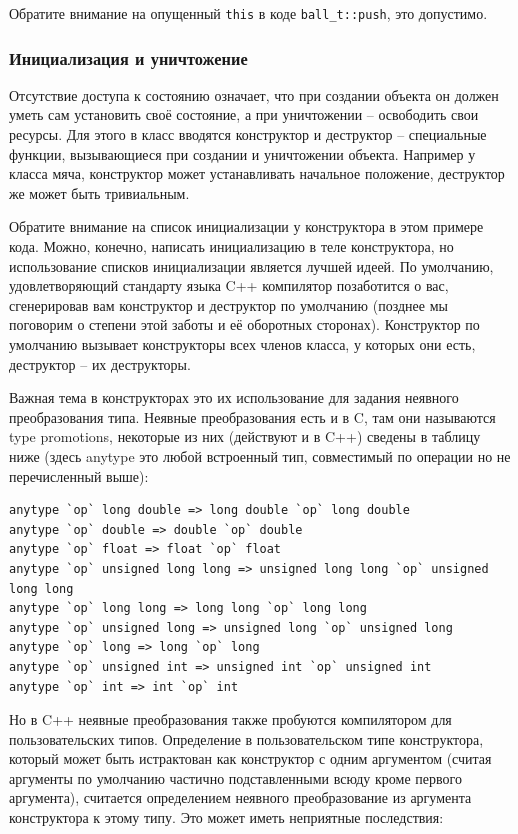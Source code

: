 \documentclass[a4paper,12pt,oneside]{article}
\begin{document}
Обратите внимание на опущенный \lstinline!this! в коде \lstinline!ball_t::push!, это допустимо.

\subsubsection{Инициализация и уничтожение}

Отсутствие доступа к состоянию означает, что при создании объекта он должен уметь сам установить своё состояние, а при уничтожении – освободить свои ресурсы. Для этого в класс вводятся конструктор и деструктор – специальные функции, вызывающиеся при создании и уничтожении объекта. Например у класса мяча, конструктор может устанавливать начальное положение, деструктор же может быть тривиальным.



Обратите внимание на список инициализации у конструктора в этом примере кода. Можно, конечно, написать инициализацию в теле конструктора, но использование списков инициализации является лучшей идеей. По умолчанию, удовлетворяющий стандарту языка C++ компилятор позаботится о вас, сгенерировав вам конструктор и деструктор по умолчанию (позднее мы поговорим о степени этой заботы и её оборотных сторонах). Конструктор по умолчанию вызывает конструкторы всех членов класса, у которых они есть, деструктор -- их деструкторы.

Важная тема в конструкторах это их использование для задания неявного преобразования типа. Неявные преобразования есть и в C, там они называются type promotions, некоторые из них (действуют и в C++) сведены в таблицу ниже (здесь anytype это любой встроенный тип, совместимый по операции но не перечисленный выше):

\begin{lstlisting}
anytype `op` long double => long double `op` long double
anytype `op` double => double `op` double
anytype `op` float => float `op` float
anytype `op` unsigned long long => unsigned long long `op` unsigned long long
anytype `op` long long => long long `op` long long
anytype `op` unsigned long => unsigned long `op` unsigned long
anytype `op` long => long `op` long
anytype `op` unsigned int => unsigned int `op` unsigned int
anytype `op` int => int `op` int
\end{lstlisting}

Но в C++ неявные преобразования также пробуются компилятором для пользовательских типов. Определение в пользовательском типе конструктора, который может быть истрактован как конструктор с одним аргументом (считая аргументы по умолчанию частично подставленными всюду кроме первого аргумента), считается определением неявного преобразование из аргумента конструктора к этому типу. Это может иметь неприятные последствия:
\end{document}
